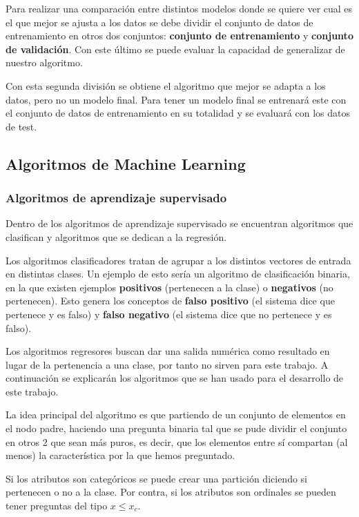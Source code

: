 Para realizar una comparación entre distintos modelos donde se quiere ver cual es el que mejor se ajusta a los datos se debe dividir el conjunto de datos de entrenamiento en otros dos conjuntos: \textbf{conjunto de entrenamiento} y \textbf{conjunto de validación}. Con este último se puede evaluar la capacidad de generalizar de nuestro algoritmo.

Con esta segunda división se obtiene el algoritmo que mejor se adapta a los datos, pero no un modelo final. Para tener un modelo final se entrenará este con el conjunto de datos de entrenamiento en su totalidad y se evaluará con los datos de test.

\subsection{Algoritmos de Machine Learning} \label{sec:algorithms}

\subsubsection{Algoritmos de aprendizaje supervisado}

Dentro de los algoritmos de aprendizaje supervisado se encuentran algoritmos que clasifican y algoritmos que se dedican a la regresión.

Los algoritmos clasificadores tratan de agrupar a los distintos vectores de entrada en distintas clases. Un ejemplo de esto sería un algoritmo de clasificación binaria, en la que existen ejemplos \textbf{positivos} (pertenecen a la clase) o \textbf{negativos} (no pertenecen). Esto genera los conceptos de \textbf{falso positivo} (el sistema dice que pertenece y es falso) y \textbf{falso negativo} (el sistema dice que no pertenece y es falso).

Los algoritmos regresores buscan dar una salida numérica como resultado en lugar de la pertenencia a una clase, por tanto no sirven para este trabajo. A continuación se explicarán los algoritmos que se han usado para el desarrollo de este trabajo.


La idea principal del algoritmo es que partiendo de un conjunto de elementos en el nodo padre, haciendo una pregunta binaria tal que se pude dividir el conjunto en otros 2 que sean más puros, es decir, que los elementos entre sí compartan (al menos) la característica por la que hemos preguntado.

Si los atributos son categóricos se puede crear una partición diciendo si pertenecen o no a la clase. Por contra, si los atributos son ordinales se pueden tener preguntas del tipo $x \leq x_c$.

